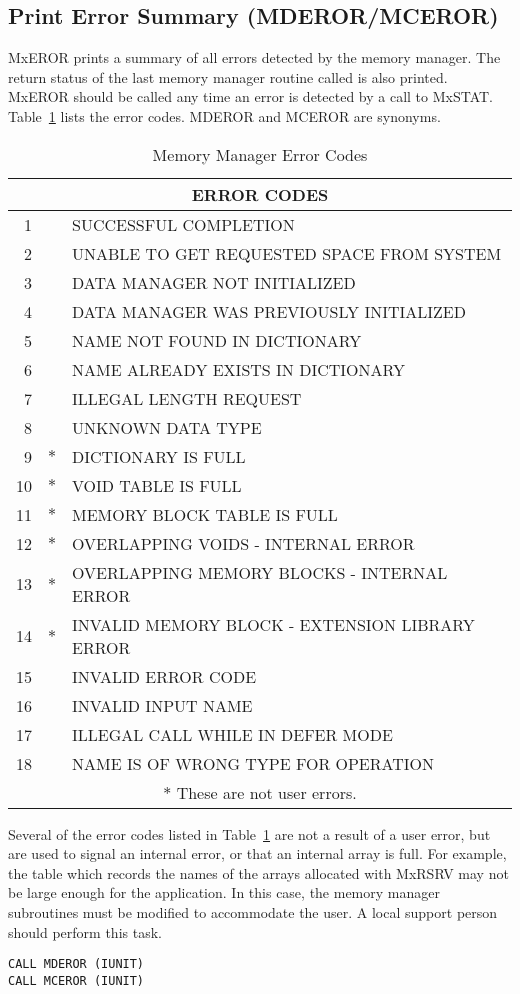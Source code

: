 \subsection{Print Error Summary (MDEROR/MCEROR)}
MxEROR prints a summary of all errors detected by the memory
manager.  The return status of the last memory manager routine called is
also printed. MxEROR should be called any time an error is
detected by a call to MxSTAT.
Table~\ref{tab:ecode} lists the error codes.
MDEROR and MCEROR are synonyms.
\begin{table}[htbp]
\centering
\caption{Memory Manager Error Codes} \label{tab:ecode}
\begin{tabular}{|rcl|} \hline \hline
\multicolumn{3}{|c|}{ERROR CODES}\\ \hline
  1 &  &  SUCCESSFUL COMPLETION\\
  2 &  &  UNABLE TO GET REQUESTED SPACE FROM SYSTEM\\
  3 &  &  DATA MANAGER NOT INITIALIZED\\
  4 &  &  DATA MANAGER WAS PREVIOUSLY INITIALIZED\\
  5 &  &  NAME NOT FOUND IN DICTIONARY\\
  6 &  &  NAME ALREADY EXISTS IN DICTIONARY\\
  7 &  &  ILLEGAL LENGTH REQUEST\\
  8 &  &  UNKNOWN DATA TYPE\\
  9 & $*$&  DICTIONARY IS FULL\\
 10 & $*$&  VOID TABLE IS FULL\\
 11 & $*$&  MEMORY BLOCK TABLE IS FULL\\
 12 & $*$&  OVERLAPPING VOIDS - INTERNAL ERROR\\
 13 & $*$&  OVERLAPPING MEMORY BLOCKS - INTERNAL ERROR\\
 14 & $*$&  INVALID MEMORY BLOCK - EXTENSION LIBRARY ERROR\\
 15 &  &  INVALID ERROR CODE\\
 16 &  &  INVALID INPUT NAME\\
 17 &  &  ILLEGAL CALL WHILE IN DEFER MODE\\
 18 &  &  NAME IS OF WRONG TYPE FOR OPERATION\\ \hline \hline
\multicolumn{3}{c}{$*$ These are not user errors.}\\
\end{tabular}
\end{table}

Several of the error codes listed in Table~\ref{tab:ecode} are not a result
of a user error, but are used to signal an internal error, or that an
internal array is full. For example, the table which records the names of
the arrays allocated with MxRSRV may not be large enough for the
application. In this case, the memory manager subroutines must be modified
to accommodate the user. A local support person should perform this task.
\begin{verbatim}
CALL MDEROR (IUNIT)
CALL MCEROR (IUNIT)
\end{verbatim}


